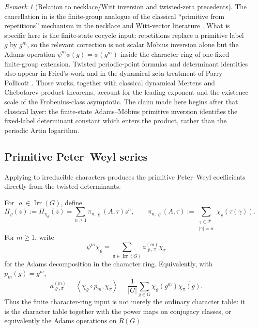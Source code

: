 \documentclass[11pt,a4paper]{amsart}
\theoremstyle{plain}
\theoremstyle{definition}
\theoremstyle{remark}
\newtheorem{remark}[theorem]{Remark}
\DeclareMathOperator{\Irr}{Irr}
\newcommand{\cP}{\mathcal P}
\begin{document}
\begin{remark}[Relation to necklace/Witt inversion and twisted-zeta
  precedents]
  \label{rem:adams-mobius-literature-position}
  The cancellation in
   is the finite-group analogue
  of the classical ``primitive from repetitions'' mechanism in the
  necklace and Witt-vector literature
  \cite{MetropolisRota1983Necklaces,Wehrhahn1990AperiodicRings}. What
  is specific here is the finite-state cocycle input:
  repetitions replace a primitive label \(g\) by \(g^m\), so the
  relevant correction is not scalar M\"obius inversion alone but the
  Adams operation \(\psi^m\phi(g)=\phi(g^m)\) inside the character ring
  of one fixed finite-group extension. Twisted periodic-point formulas
  and determinant identities also appear in Fried's work
  \cite{Fried1983PeriodicPointsTwistedCoefficients,Fried1983HomologicalIdentitiesClosedOrbits} and in the dynamical-zeta
  treatment of Parry--Pollicott \cite{ParryPollicott1990Zeta}. Those
  works, together with classical dynamical Mertens and Chebotarev product
  theorems, account for the leading exponent and the existence scale of the
  Frobenius-class asymptotic.  The claim made here begins after that classical
  layer: the finite-state Adams--M\"obius primitive inversion identifies the
  fixed-label determinant constant which enters the product, rather than the
  periodic Artin logarithm.
\end{remark}


\subsection{Primitive Peter--Weyl series}

Applying  to irreducible
characters produces the primitive Peter--Weyl coefficients directly
from the twisted determinants.

For \(\varrho\in\Irr(G)\), define
\begin{equation}\label{eq:primitive-peter-weyl-series}
  \Pi_\varrho(z):=\Pi_{\chi_\varrho}(z)
  =\sum_{n\ge 1}\pi_{n,\varrho}(A,\tau)z^n,
  \qquad
  \pi_{n,\varrho}(A,\tau)
  :=\sum_{\substack{\gamma\in\cP\\ |\gamma|=n}}
    \chi_\varrho(\tau(\gamma)).
\end{equation}
For \(m\ge 1\), write
\begin{equation}\label{eq:adams-character-decomposition}
  \psi^m\chi_\varrho
  =\sum_{\pi\in\Irr(G)}a_{\varrho,\pi}^{(m)}\chi_\pi
\end{equation}
for the Adams decomposition in the character ring. Equivalently, with
\(p_m(g)=g^m\),
\begin{equation}\label{eq:adams-coefficient-inner-product}
  a_{\varrho,\pi}^{(m)}
  =
  \left\langle \chi_\varrho\circ p_m,\chi_\pi\right\rangle
  =
  \frac{1}{|G|}\sum_{g\in G}
    \chi_\varrho(g^m)\overline{\chi_\pi(g)}.
\end{equation}
Thus the finite character-ring input is not merely the ordinary
character table: it is the character table together with the power maps
on conjugacy classes, or equivalently the Adams operations on \(R(G)\).
\end{document}
